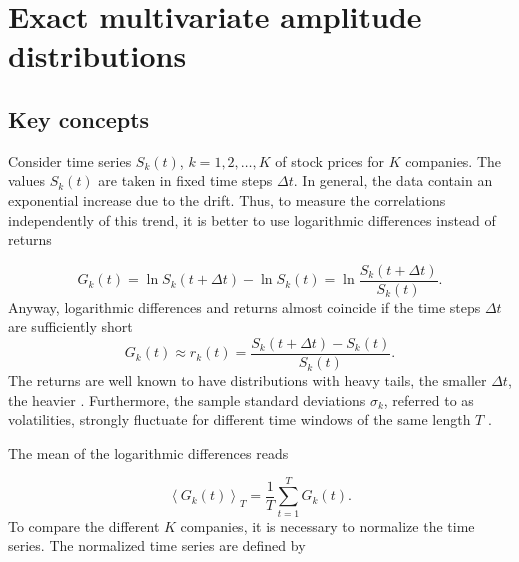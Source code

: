 \section{Exact multivariate amplitude distributions}
\label{sec:exact_distributions}


\subsection{Key concepts}\label{subsec:key_concepts}

Consider time series $S_{k} \left( t \right)$, $k = 1, 2, \ldots, K$ of stock
prices for $K$ companies. The values $S_{k} \left( t \right)$ are taken in
fixed time steps $\Delta t$. In general, the data contain an exponential
increase due to the drift. Thus, to measure the correlations independently of
this trend, it is better to use logarithmic differences instead of returns

\begin{equation}
    G_{k} \left( t \right) = \ln S_{k} \left( t + \Delta t \right) -
    \ln S_{k} \left(t \right) = \ln \frac{S_{k} \left( t + \Delta t \right)}
    {S_{k} \left(t \right)}.
\end{equation}
Anyway, logarithmic differences and returns almost coincide if the time steps
$\Delta t$ are sufficiently short \cite{subtle_nature,empirical_facts}
\begin{equation}
    G_{k} \left(t\right) \approx r_{k} \left(t\right)
    = \frac{S_{k} \left( t + \Delta t \right) - S_{k} \left( t \right)}
    {S_{k} \left( t \right)}.
\end{equation}
The returns are well known to have distributions with heavy tails, the smaller
$\Delta t$, the heavier
\cite{non_stationarity_fin_guhr}. Furthermore, the sample standard deviations
$\sigma_{k}$, referred to as volatilities, strongly fluctuate for different
time windows of the same length $T$
\cite{non_stationarity_fin_guhr,volatility_change}.

The mean of the logarithmic differences reads \cite{exact_distributions_guhr}

\begin{equation}
    \left\langle G_{k} \left( t \right) \right\rangle_{T} = \frac{1}{T}
    \sum_{t = 1}^{T} G_{k} \left( t \right).
\end{equation}
To compare the different $K$ companies, it is necessary to normalize the time
series. The normalized time series are defined by
\cite{exact_distributions_guhr,non_stationarity_fin_guhr}

